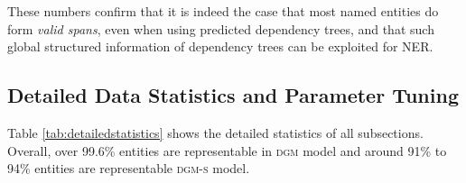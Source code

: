 These numbers confirm that it is indeed the case that most named entities do form {\em valid spans}, even when using predicted dependency trees,
and that such global structured information of dependency trees can be exploited for NER.

\subsection{Detailed Data Statistics and Parameter Tuning}
Table \ref{tab:detailedstatistics} shows the detailed statistics of all subsections. 
Overall, over 99.6\% entities are representable in \textsc{dgm} model and around 91\% to 94\% entities are representable \textsc{dgm-s} model. 
\begin{table}[h]
	
	\centering
\end{table}
